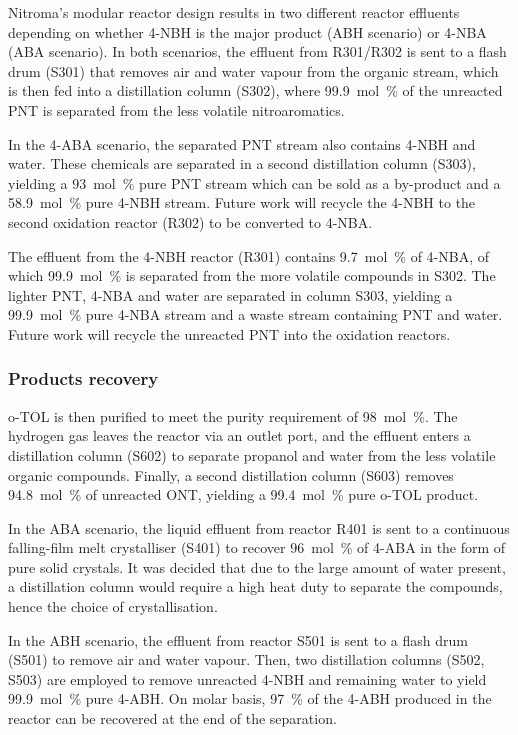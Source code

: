 Nitroma's modular reactor design results in two different reactor effluents depending on whether 4-NBH is the major product (ABH scenario) or 4-NBA (ABA scenario). In both scenarios, the effluent from R301/R302 is sent to a flash drum (S301) that removes air and water vapour from the organic stream, which is then fed into a distillation column (S302), where \SI{99.9}{mol\percent} of the unreacted PNT is separated from the less volatile nitroaromatics. 

In the 4-ABA scenario, the separated PNT stream also contains 4-NBH and water. These chemicals are separated in a second distillation column (S303), yielding a \SI{93}{mol\percent} pure PNT stream which can be sold as a by-product and a \SI{58.9}{mol\percent} pure 4-NBH stream. Future work will recycle the 4-NBH to the second oxidation reactor (R302) to be converted to 4-NBA.

The effluent from the 4-NBH reactor (R301) contains \SI{9.7}{mol\percent} of 4-NBA, of which \SI{99.9}{mol\percent} is separated from the more volatile compounds in S302. The lighter PNT, 4-NBA and water are separated in column S303, yielding a \SI{99.9}{mol\percent} pure 4-NBA stream and a waste stream containing PNT and water. Future work will recycle the unreacted PNT into the oxidation reactors.

\subsubsection{Products recovery}

o-TOL is then purified to meet the purity requirement of \SI{98}{mol\percent}.
The hydrogen gas leaves the reactor via an outlet port, and the effluent enters a distillation column (S602) to separate propanol and water from the less volatile organic compounds.
Finally, a second distillation column (S603) removes \SI{94.8}{mol\percent} of unreacted ONT, yielding a \SI{99.4}{mol\percent} pure o-TOL product.

In the ABA scenario, the liquid effluent from reactor R401 is sent to a continuous falling-film melt crystalliser (S401) to recover \SI{96}{mol\percent} of 4-ABA in the form of pure solid crystals. It was decided that due to the large amount of water present, a distillation column would require a high heat duty to separate the compounds, hence the choice of crystallisation. 

 In the ABH scenario, the effluent from reactor S501 is sent to a flash drum (S501) to remove air and water vapour. Then, two distillation columns (S502, S503) are employed to remove unreacted 4-NBH and remaining water to yield  \SI{99.9}{mol\percent} pure 4-ABH. On molar basis, \SI{97}{\percent} of the 4-ABH produced in the reactor can be recovered at the end of the separation.






